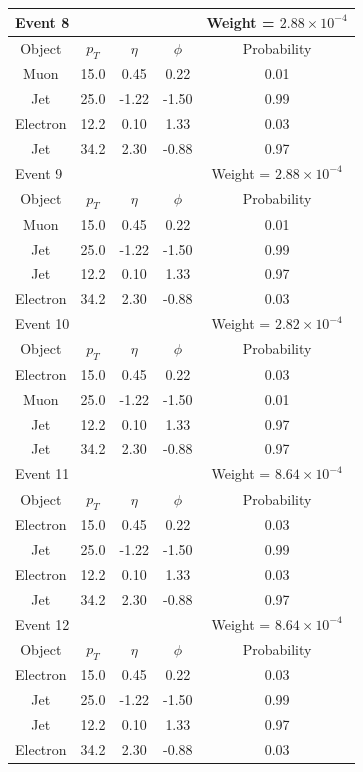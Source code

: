 \documentclass{cmspaper}
\begin{document}
\begin{tabular}{|c|c|c|c|c|}\hline 
\multicolumn{4}{|l|}{Event 8} & Weight = $2.88 \times 10^{-4}$ \\
\hline
Object & $p_T$ & $\eta$ & $\phi$ & Probability \\ 
 \hline 
Muon & 15.0 & 0.45 & 0.22 & 0.01 \\
Jet & 25.0 & -1.22 & -1.50 & 0.99 \\
Electron & 12.2 & 0.10 & 1.33 &  0.03 \\
Jet & 34.2 & 2.30 & -0.88 & 0.97 \\
 \hline 
 \hline 

\multicolumn{4}{|l|}{Event 9} & Weight = $2.88 \times 10^{-4}$ \\
\hline
Object & $p_T$ & $\eta$ & $\phi$ & Probability \\ 
 \hline 
Muon & 15.0 & 0.45 & 0.22 & 0.01 \\
Jet & 25.0 & -1.22 & -1.50 & 0.99 \\
Jet & 12.2 & 0.10 & 1.33 &  0.97 \\
Electron & 34.2 & 2.30 & -0.88 & 0.03 \\
 \hline 
 \hline 



\multicolumn{4}{|l|}{Event 10} & Weight = $2.82 \times 10^{-4}$ \\
\hline
Object & $p_T$ & $\eta$ & $\phi$ & Probability \\ 
 \hline 
Electron & 15.0 & 0.45 & 0.22 & 0.03 \\
Muon & 25.0 & -1.22 & -1.50 & 0.01 \\
Jet & 12.2 & 0.10 & 1.33 &  0.97 \\
Jet & 34.2 & 2.30 & -0.88 & 0.97 \\
 \hline 
 \hline 

\multicolumn{4}{|l|}{Event 11} & Weight = $8.64 \times 10^{-4}$ \\
\hline
Object & $p_T$ & $\eta$ & $\phi$ & Probability \\ 
 \hline 
Electron & 15.0 & 0.45 & 0.22 & 0.03 \\
Jet & 25.0 & -1.22 & -1.50 & 0.99 \\
Electron & 12.2 & 0.10 & 1.33 &  0.03 \\
Jet & 34.2 & 2.30 & -0.88 & 0.97 \\
 \hline 
 \hline 

\multicolumn{4}{|l|}{Event 12} & Weight = $8.64 \times 10^{-4}$ \\
\hline
Object & $p_T$ & $\eta$ & $\phi$ & Probability \\ 
 \hline 
Electron & 15.0 & 0.45 & 0.22 & 0.03 \\
Jet & 25.0 & -1.22 & -1.50 & 0.99 \\
Jet & 12.2 & 0.10 & 1.33 &  0.97 \\
Electron & 34.2 & 2.30 & -0.88 & 0.03 \\
 \hline 
 \hline 


\end{tabular}
\end{document}
